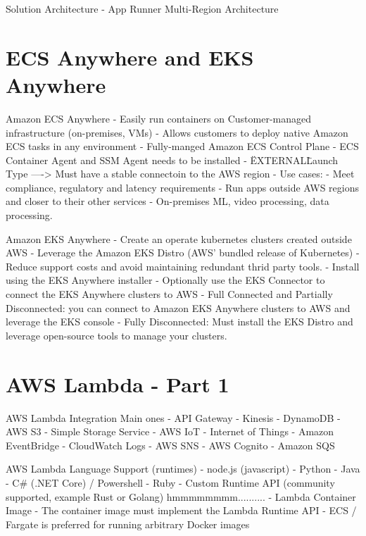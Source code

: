 
Solution Architecture - App Runner Multi-Region Architecture


\section{ECS Anywhere and EKS Anywhere}
Amazon ECS Anywhere
- Easily run containers on Customer-managed infrastructure (on-premises, VMs)
- Allows customers to deploy native Amazon ECS tasks in any environment
- Fully-manged Amazon ECS Control Plane
- ECS Container Agent and SSM Agent needs to be installed
- \"EXTERNAL\" Launch Type
----> Must have a stable connectoin to the AWS region
- Use cases:
- Meet compliance, regulatory and latency requirements
- Run apps outside AWS regions and closer to their other services
- On-premises ML, video processing, data processing.

Amazon EKS Anywhere
- Create an operate kubernetes clusters created outside AWS
- Leverage the Amazon EKS Distro (AWS' bundled release of Kubernetes)
- Reduce support costs and avoid maintaining redundant thrid party tools.
- Install using the EKS Anywhere installer
- Optionally use the EKS Connector to connect the EKS Anywhere clusters to AWS
- Full Connected and Partially Disconnected: you can connect to Amazon EKS Anywhere clusters to AWS and leverage the EKS console
- Fully Disconnected: Must install the EKS Distro and leverage open-source tools to manage your clusters.


\section{AWS Lambda - Part 1}
AWS Lambda Integration Main ones
- API Gateway
- Kinesis
- DynamoDB
- AWS S3 - Simple Storage Service
- AWS IoT - Internet of Things
- Amazon EventBridge
- CloudWatch Logs
- AWS SNS
- AWS Cognito
- Amazon SQS


AWS Lambda Language Support (runtimes)
- node.js (javascript)
- Python
- Java
- C# (.NET Core) / Powershell
- Ruby
- Custom Runtime API (community supported, example Rust or Golang) hmmmmmmmm..........
- Lambda Container Image
- The container image must implement the Lambda Runtime API
- ECS / Fargate is preferred for running arbitrary Docker images

